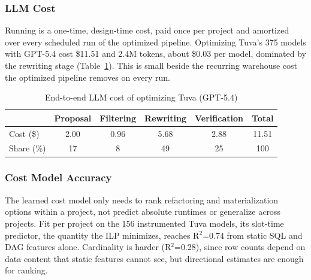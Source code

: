\subsubsection{LLM Cost}
\label{dag:sec:eval-llm-cost}

Running \dagsmith{} is a one-time, design-time cost, paid once per project and amortized over every scheduled run of the optimized pipeline. Optimizing Tuva's 375 models with GPT-5.4 cost \$11.51 and 2.4M tokens, about \$0.03 per model, dominated by the rewriting stage (Table~\ref{dag:tab:llmcost}). This is small beside the recurring warehouse cost the optimized pipeline removes on every run.

\begin{table}[tb]
\centering
\caption{End-to-end LLM cost of optimizing Tuva (GPT-5.4)}
\inv
\label{dag:tab:llmcost}
\small
\begin{tabular}{lccccc}
\toprule
 & Proposal & Filtering & Rewriting & Verification & Total \\
\midrule
Cost (\$)  & 2.00 & 0.96 & 5.68 & 2.88 & 11.51 \\
Share (\%) & 17   & 8    & 49   & 25   & 100 \\
\bottomrule
\end{tabular}
\inv
\end{table}

\subsubsection{Cost Model Accuracy}
\label{dag:sec:eval-cost-model}

The learned cost model only needs to rank refactoring and materialization options within a project, not predict absolute runtimes or generalize across projects. Fit per project on the 156 instrumented Tuva models, its slot-time predictor, the quantity the ILP minimizes, reaches R$^2$=0.74 from static SQL and DAG features alone. Cardinality is harder (R$^2$=0.28), since row counts depend on data content that static features cannot see, but directional estimates are enough for ranking.
